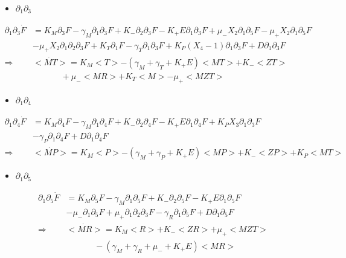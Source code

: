 \documentclass{article}
\begin{document}
\begin{itemize}
    \item $\partial_1\partial_3$
\end{itemize}
\begin{align*}
    \partial_1\partial_3\Dot{F} &= K_M\partial_3F - \gamma_M\partial_1\partial_3F + K_-\partial_2\partial_3F - K_+E\partial_1\partial_3F + \mu_-X_2\partial_1\partial_5F - \mu_+X_2\partial_1\partial_5F\\
                                &- \mu_+X_2\partial_1\partial_2\partial_3F + K_T\partial_1F - \gamma_T\partial_1\partial_3F + K_P(X_4-1)\partial_1\partial_3F + D\partial_1\partial_3F\\
            \Longrightarrow     & <\Dot{MT}> = K_M<T> - (\gamma_M + \gamma_T + K_+E)<MT> + K_-<ZT>\\
                                & \hspace{40pt}+ \mu_-<MR> + K_T<M> - \mu_+<MZT>
\end{align*}

\begin{itemize}
    \item $\partial_1\partial_4$
\end{itemize}
\begin{align*}
    \partial_1\partial_4\Dot{F} &= K_M\partial_4F - \gamma_M\partial_1\partial_4F + K_-\partial_2\partial_4F - K_+E\partial_1\partial_4F + K_PX_3\partial_1\partial_3F\\
                                &- \gamma_P\partial_1\partial_4F + D\partial_1\partial_4F\\
                \Longrightarrow & <\Dot{MP}> = K_M<P> - (\gamma_M + \gamma_P + K_+E)<MP> + K_-<ZP> + K_P<MT>
\end{align*}

\begin{itemize}
    \item $\partial_1\partial_5$
\end{itemize}
\begin{align*}
    \partial_1\partial_5\Dot{F} &= K_M\partial_5F - \gamma_M\partial_1\partial_5F + K_-\partial_2\partial_5F - K_+E\partial_1\partial_5F\\
                                &- \mu_-\partial_1\partial_5F + \mu_+\partial_1\partial_2\partial_3F - \gamma_R\partial_1\partial_5F + D\partial_1\partial_5F\\
            \Longrightarrow     & <\Dot{MR}> = K_M<R> + K_-<ZR> + \mu_+<MZT>\\
                                &\hspace{40pt}- (\gamma_M + \gamma_R + \mu_- + K_+E)<MR>
\end{align*}
\end{document}
